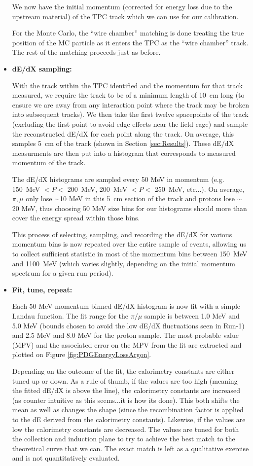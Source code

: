 \begin{itemize}
We now have the initial momentum (corrected for energy loss due to the upstream material) of the TPC track which we can use for our calibration.

For the Monte Carlo, the ``wire chamber'' matching is done treating the true position of the MC particle as it enters the TPC as the ``wire chamber'' track. The rest of the matching proceeds just as before.

\item \textbf{dE/dX sampling:}

With the track within the TPC identified and the momentum for that track measured, we require the track to be of a minimum length of 10~cm long (to ensure we are away from any interaction point where the track may be broken into subsequent tracks). We then take the first twelve spacepoints of the track (excluding the first point to avoid edge effects near the field cage) and sample the reconstructed dE/dX for each point along the track. On average, this samples 5~cm of the track (shown in Section \ref{sec:Results}). These dE/dX measurments are then put into a histogram that corresponds to measured momentum of the track.

The dE/dX histograms are sampled every 50 MeV in momentum (e.g. 150~MeV $< P <$ 200~MeV, 200~MeV $< P <$ 250~MeV, etc...). On average, $\pi, \mu$ only lose $\sim$10 MeV in this 5~cm section of the track and protons lose $\sim$20 MeV, thus choosing 50 MeV size bins for our histograms should more than cover the energy spread within those bins.

This process of selecting, sampling, and recording the dE/dX for various momentum bins is now repeated over the entire sample of events, allowing us to collect sufficient statistic in most of the momentum bins between 150~MeV and 1100~MeV (which varies slightly, depending on the initial momentum spectrum for a given run period).

\item \textbf{Fit, tune, repeat:}

Each 50 MeV momentum binned dE/dX histogram is now fit with a simple Landau function. The fit range for the $\pi / \mu$ sample is between 1.0 MeV and 5.0 MeV (bounds chosen to avoid the low dE/dX fluctuations seen in Run-1) and 2.5 MeV and 8.0 MeV for the proton sample. The most probable value (MPV) and the associated error on the MPV from the fit are extracted and plotted on Figure \ref{fig:PDGEnergyLossArgon}.

Depending on the outcome of the fit, the calorimetry constants are either tuned up or down. As a rule of thumb, if the values are too high (meaning the fitted dE/dX is above the line), the calorimetry constants are increased (as counter intuitive as this seems...it is how its done). This both shifts the mean as well as changes the shape (since the recombination factor is applied to the dE derived from the calorimetry constants). Likewise, if the values are low the calorimetry constants are decreased. The values are tuned for both the collection and induction plane to try to achieve the best match to the theoretical curve that we can. The exact match is left as a qualitative exercise and is not quantitatively evaluated.


\end{itemize}
